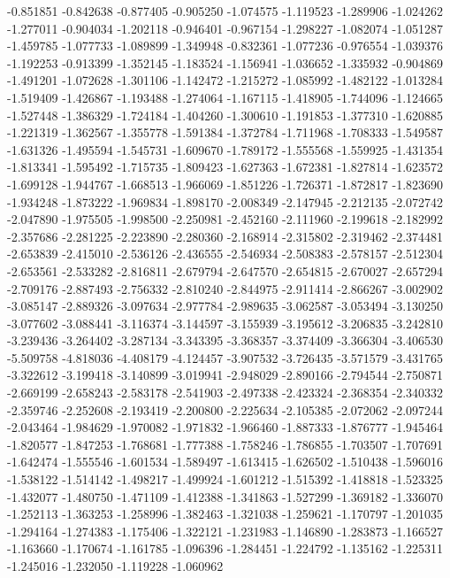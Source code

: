 -0.851851
-0.842638
-0.877405
-0.905250
-1.074575
-1.119523
-1.289906
-1.024262
-1.277011
-0.904034
-1.202118
-0.946401
-0.967154
-1.298227
-1.082074
-1.051287
-1.459785
-1.077733
-1.089899
-1.349948
-0.832361
-1.077236
-0.976554
-1.039376
-1.192253
-0.913399
-1.352145
-1.183524
-1.156941
-1.036652
-1.335932
-0.904869
-1.491201
-1.072628
-1.301106
-1.142472
-1.215272
-1.085992
-1.482122
-1.013284
-1.519409
-1.426867
-1.193488
-1.274064
-1.167115
-1.418905
-1.744096
-1.124665
-1.527448
-1.386329
-1.724184
-1.404260
-1.300610
-1.191853
-1.377310
-1.620885
-1.221319
-1.362567
-1.355778
-1.591384
-1.372784
-1.711968
-1.708333
-1.549587
-1.631326
-1.495594
-1.545731
-1.609670
-1.789172
-1.555568
-1.559925
-1.431354
-1.813341
-1.595492
-1.715735
-1.809423
-1.627363
-1.672381
-1.827814
-1.623572
-1.699128
-1.944767
-1.668513
-1.966069
-1.851226
-1.726371
-1.872817
-1.823690
-1.934248
-1.873222
-1.969834
-1.898170
-2.008349
-2.147945
-2.212135
-2.072742
-2.047890
-1.975505
-1.998500
-2.250981
-2.452160
-2.111960
-2.199618
-2.182992
-2.357686
-2.281225
-2.223890
-2.280360
-2.168914
-2.315802
-2.319462
-2.374481
-2.653839
-2.415010
-2.536126
-2.436555
-2.546934
-2.508383
-2.578157
-2.512304
-2.653561
-2.533282
-2.816811
-2.679794
-2.647570
-2.654815
-2.670027
-2.657294
-2.709176
-2.887493
-2.756332
-2.810240
-2.844975
-2.911414
-2.866267
-3.002902
-3.085147
-2.889326
-3.097634
-2.977784
-2.989635
-3.062587
-3.053494
-3.130250
-3.077602
-3.088441
-3.116374
-3.144597
-3.155939
-3.195612
-3.206835
-3.242810
-3.239436
-3.264402
-3.287134
-3.343395
-3.368357
-3.374409
-3.366304
-3.406530
-5.509758
-4.818036
-4.408179
-4.124457
-3.907532
-3.726435
-3.571579
-3.431765
-3.322612
-3.199418
-3.140899
-3.019941
-2.948029
-2.890166
-2.794544
-2.750871
-2.669199
-2.658243
-2.583178
-2.541903
-2.497338
-2.423324
-2.368354
-2.340332
-2.359746
-2.252608
-2.193419
-2.200800
-2.225634
-2.105385
-2.072062
-2.097244
-2.043464
-1.984629
-1.970082
-1.971832
-1.966460
-1.887333
-1.876777
-1.945464
-1.820577
-1.847253
-1.768681
-1.777388
-1.758246
-1.786855
-1.703507
-1.707691
-1.642474
-1.555546
-1.601534
-1.589497
-1.613415
-1.626502
-1.510438
-1.596016
-1.538122
-1.514142
-1.498217
-1.499924
-1.601212
-1.515392
-1.418818
-1.523325
-1.432077
-1.480750
-1.471109
-1.412388
-1.341863
-1.527299
-1.369182
-1.336070
-1.252113
-1.363253
-1.258996
-1.382463
-1.321038
-1.259621
-1.170797
-1.201035
-1.294164
-1.274383
-1.175406
-1.322121
-1.231983
-1.146890
-1.283873
-1.166527
-1.163660
-1.170674
-1.161785
-1.096396
-1.284451
-1.224792
-1.135162
-1.225311
-1.245016
-1.232050
-1.119228
-1.060962
